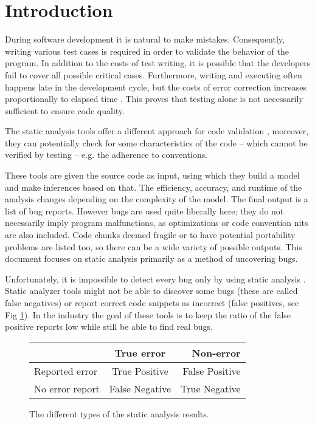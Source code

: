 
\section{Introduction}
During software development it is natural to make mistakes. Consequently,
writing various test cases is required in order to validate the behavior
of the program. In addition to the costs of test writing, it is possible that the developers fail
to cover all possible critical cases. Furthermore, writing and executing
often happens late in the development cycle, but the costs of error correction
increases proportionally to elapsed time  \cite{fixcost}. This proves that 
testing alone is not necessarily sufficient to ensure code quality.  %

The static analysis tools offer a different approach for code validation 
\cite{Zhivich2009} \cite{Bessey2010}, moreover, they can potentially check for 
some characteristics of the code -- which cannot be verified by testing -- e.g. 
the adherence to conventions.

These tools are given the source code as input, using which they build a model 
and make inferences based on that. The efficiency, accuracy, and runtime of the 
analysis changes depending on the complexity of the model.
The final output is a list of bug reports. However bugs are used quite 
liberally here; they do not necessarily imply program malfunctions, as 
optimizations or code convention nits are also included. Code chunks deemed 
fragile or to have potential portability problems are listed too, so there can 
be a wide variety of possible outputs.
This document focuses on static analysis primarily as a method of uncovering 
bugs.
 
Unfortunately, it is impossible to detect every 
bug only by using static analysis \cite{Rice:53}. Static analyzer tools might 
not be able to discover some bugs (these are called false negatives) or report 
correct code snippets as incorrect (false positives, see Fig \ref{fig:bes}). In 
the industry the goal of these tools is to keep the ratio of the false positive 
reports low while still be able to find real bugs.

\begin{figure}[!h]
	\begin{center}
		\begin{tabular}{ | l | c | r | }
			\hline
			& True error   & Non-error \\ \hline
			Reported error   & True Positive  & False Positive   \\ \hline
			No error report & False Negative & True Negative    \\
			\hline
		\end{tabular}
	\end{center}
	\caption{The different types of the static analysis results.}
	\label{fig:bes}
\end{figure}

